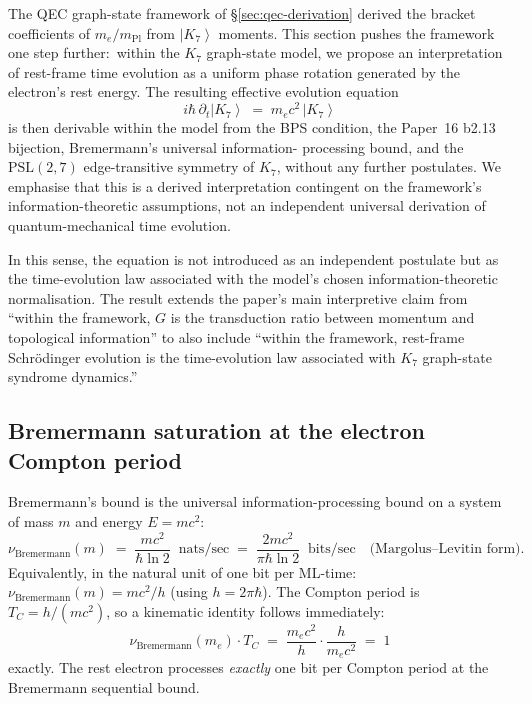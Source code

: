 \documentclass[11pt]{article}
\newcommand{\ket}[1]{\left|#1\right\rangle}
\newcommand{\mPl}{m_{\mathrm{Pl}}}
\newcommand{\PSL}{\mathrm{PSL}}
\begin{document}
The QEC graph-state framework of \S\ref{sec:qec-derivation} derived
the bracket coefficients of $m_e/\mPl$ from $\ket{K_7}$ moments.
This section pushes the framework one step further:\ within the
$K_7$ graph-state model, we propose an interpretation of rest-frame
time evolution as a uniform phase rotation generated by the
electron's rest energy.  The resulting effective evolution equation
\begin{equation}
  i\hbar\, \partial_t \ket{K_7} \;=\; m_e c^2\, \ket{K_7}
  \label{eq:rest-schrodinger}
\end{equation}
is then derivable within the model from the BPS condition, the
Paper~16 b2.13 bijection, Bremermann's universal information-
processing bound, and the $\PSL(2,7)$ edge-transitive symmetry of
$K_7$, without any further postulates.  We emphasise that this is
a derived interpretation contingent on the framework's
information-theoretic assumptions, not an independent universal
derivation of quantum-mechanical time evolution.

In this sense, the equation is not introduced as an independent
postulate but as the time-evolution law associated with the model's
chosen information-theoretic normalisation.  The result extends the
paper's main interpretive claim from ``within the framework, $G$ is
the transduction ratio between momentum and topological information''
to also include ``within the framework, rest-frame Schr\"odinger
evolution is the time-evolution law associated with $K_7$
graph-state syndrome dynamics.''

\subsection{Bremermann saturation at the electron Compton period}
\label{sec:bremermann}

Bremermann's bound is the universal information-processing bound
on a system of mass $m$ and energy $E = mc^2$:
\begin{equation}
  \nu_{\text{Bremermann}}(m)
  \;=\;
  \frac{m c^2}{\hbar \ln 2}\;\;\text{nats/sec}
  \;=\;
  \frac{2 m c^2}{\pi \hbar \ln 2}\;\;\text{bits/sec}
  \quad
  \text{(Margolus--Levitin form)}.
\end{equation}
Equivalently, in the natural unit of one bit per ML-time:
$\nu_{\text{Bremermann}}(m) = mc^2 / h$ (using $h = 2\pi\hbar$).
The Compton period is $T_C = h/(mc^2)$, so a kinematic identity
follows immediately:
\begin{equation}
  \boxed{\quad
    \nu_{\text{Bremermann}}(m_e) \cdot T_C \;=\;
    \frac{m_e c^2}{h} \cdot \frac{h}{m_e c^2} \;=\; 1
  \quad}
  \label{eq:bremermann-compton}
\end{equation}
exactly.  The rest electron processes \emph{exactly} one bit per Compton
period at the Bremermann sequential bound.
\end{document}
